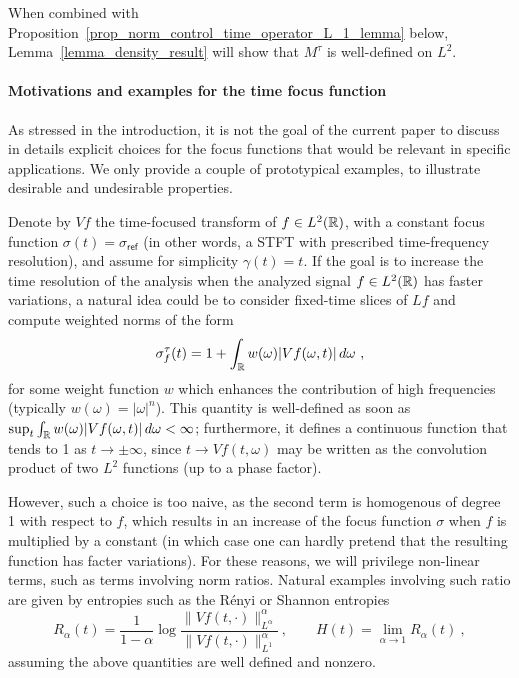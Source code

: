When combined with Proposition~\ref{prop_norm_control_time_operator_L_1_lemma} below, Lemma~\ref{lemma_density_result} will show that $M^\tau$ is well-defined on $L^2$.

\paragraph{Motivations and examples for the time focus function}\label{ssec_time_focus_function}
As stressed in the introduction, it is not the goal of the current paper to discuss in details explicit choices for the focus functions that would be relevant in specific applications. We only provide a couple of prototypical examples, to illustrate desirable and undesirable properties.

Denote by $Vf$ the time-focused transform of $f\in L^2(\mathbb{R})$, with a constant focus function $\sigma(t)=\sigma_\mathsf{ref}$ (in other words, a STFT with prescribed time-frequency resolution), and assume for simplicity $\gamma(t)=t$. If the goal is to increase the time resolution of the analysis when the analyzed signal $f\in L^2(\mathbb{R})$ has faster variations, a natural idea could be to consider fixed-time slices of $Lf$ and compute weighted norms of the form
\[
\sigma_f^\tau(t) = 1 + \int_{\mathbb{R}} w(\omega) |Vf(\omega,t)|\,d\omega \ ,
\]
for some weight function $w$ which enhances the contribution of high frequencies (typically $w(\omega) = |\omega|^n$). This quantity is well-defined as soon as $\sup_t \int_{\mathbb{R}} w(\omega) |Vf(\omega,t)|\,d\omega<\infty$; furthermore, it defines a continuous function that tends to 1 as $t\to\pm\infty$, since $t\to Vf(t,\omega)$ may be written as the convolution product of two $L^2$ functions (up to a phase factor).

However, such a choice is too naive, as the second term is homogenous of degree 1 with respect to $f$, which results in an increase of the focus function $\sigma$ when $f$ is multiplied by a constant (in which case one can hardly pretend that the resulting function has facter variations). For these reasons, we will privilege non-linear terms, such as terms involving norm ratios. Natural examples involving such ratio are given by entropies such as the Rényi or Shannon entropies
\[
R_\alpha(t) = \frac{1}{1-\alpha} \log \frac{\|Vf(t,\cdot)\|_{L^{\alpha}}^{\alpha}}{\|Vf(t,\cdot)\|_{L^{1}}^{\alpha}}\ ,\qquad H(t) = \lim_{\alpha\to 1} R_\alpha(t)\ ,
\]
assuming the above quantities are well defined and nonzero.

